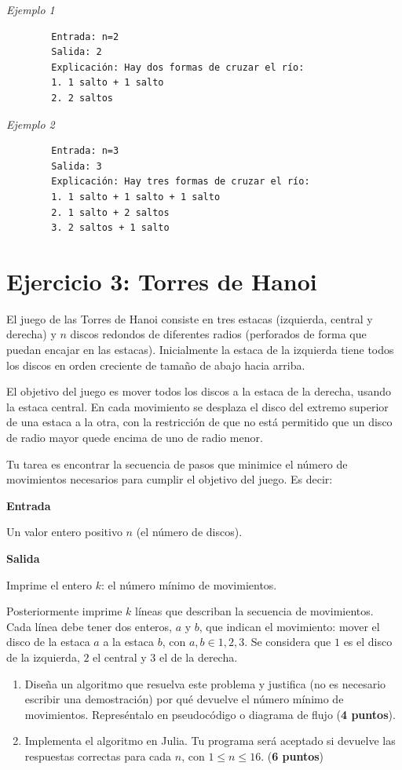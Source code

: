 \documentclass[a4paper,12pt]{article}
\begin{document}
    \textit{Ejemplo 1}
    \begin{verbatim}
        Entrada: n=2
        Salida: 2
        Explicación: Hay dos formas de cruzar el río:
        1. 1 salto + 1 salto
        2. 2 saltos
    \end{verbatim}
    \textit{Ejemplo 2}
    \begin{verbatim}
        Entrada: n=3
        Salida: 3
        Explicación: Hay tres formas de cruzar el río:
        1. 1 salto + 1 salto + 1 salto
        2. 1 salto + 2 saltos
        3. 2 saltos + 1 salto
    \end{verbatim}
\newpage
\section*{Ejercicio 3: Torres de Hanoi} 
El juego de las Torres de Hanoi consiste en tres estacas 
(izquierda, central y derecha) y $n$ discos redondos de 
diferentes radios (perforados de forma que puedan encajar en 
las estacas). Inicialmente la estaca de la izquierda tiene todos
los discos en orden creciente de tamaño de abajo hacia 
arriba.

El objetivo del juego es mover todos los discos a la estaca
de la derecha, usando la estaca central. En cada 
movimiento se desplaza el disco del extremo superior de una
estaca a la otra, con la restricción de que no está permitido 
que un disco de radio mayor quede encima de uno de radio menor. 

Tu tarea es encontrar la secuencia de pasos que minimice
el número de movimientos necesarios para cumplir el objetivo
del juego. Es decir:

\textbf{Entrada}

Un valor entero positivo $n$ (el número de discos). 

\textbf{Salida}

Imprime el entero $k$: el número mínimo de movimientos.

Posteriormente imprime $k$ líneas que describan la secuencia
de movimientos. Cada línea debe tener dos enteros, $a$ y $b$, que
indican el movimiento: mover el disco de la estaca $a$ a la
estaca $b$, con $a,b\in{1,2,3}$. Se considera que $1$ es el disco
de la izquierda, $2$ el central y $3$ el de la derecha.

    \begin{enumerate}
        \item Diseña un algoritmo que resuelva este problema y justifica (no es necesario escribir una
        demostración) por qué devuelve el número mínimo de movimientos.
        Represéntalo en pseudocódigo o diagrama de flujo 
        (\textbf{4 puntos}).
        \item Implementa el algoritmo en Julia. Tu programa
        será aceptado si devuelve las respuestas correctas 
        para cada $n$, con $1\leq n\leq 16$.
        (\textbf{6 puntos})
    \end{enumerate}
\end{document}
